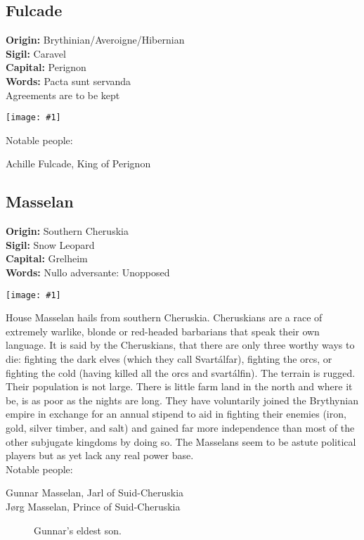 \documentclass[a4paper]{dnd5}
\newcommand\inc[1]{
 \begin{center}\texttt{[image: \#1]}\end{center}
}
\newcommand\origin{\textbf{Origin: }}
\newcommand\sigil{\textbf{Sigil: }}
\newcommand\words{\textbf{Words: }}
\newcommand\wordsii{\hspace*{4em}}
\newcommand\capital{\textbf{Capital: }}
\begin{document}
\subsection{Fulcade}
\origin Brythinian/Averoigne/Hibernian\\
\sigil Caravel\\
\capital Perignon\\
\words Pacta sunt servanda\\
\wordsii Agreements are to be kept\\
\inc{fulcade.png}

Notable people:
\begin{description}
\item[Achille Fulcade, King of Perignon]
\end{description}



\subsection{Masselan}
\origin Southern Cheruskia\\
\sigil Snow Leopard\\
\capital Grelheim\\
\words Nullo adversante: Unopposed\\
\inc{masselan.png}

House Masselan hails from southern Cheruskia.  Cheruskians are a race of extremely warlike, blonde or red-headed barbarians that speak their own language.  It is said by the Cheruskians, that there are only three worthy ways to die: fighting the dark elves (which they call Svartálfar), fighting the orcs, or fighting the cold (having killed all the orcs and svartálfin).  The terrain is rugged.  Their population is not large.  There is little farm land in the north and where it be, is as poor as the nights are long.  They have voluntarily joined the Brythynian empire in exchange for an annual stipend to aid in fighting their enemies (iron, gold, silver timber, and salt) and gained far more independence than most of the other subjugate kingdoms by doing so.  The Masselans seem to be astute political players but as yet lack any real power base.\\

Notable people:
\begin{description}
\item[Gunnar Masselan, Jarl of Suid-Cheruskia]
\item[Jørg Masselan, Prince of Suid-Cheruskia]  Gunnar's eldest son.
\end{description}
\end{document}
